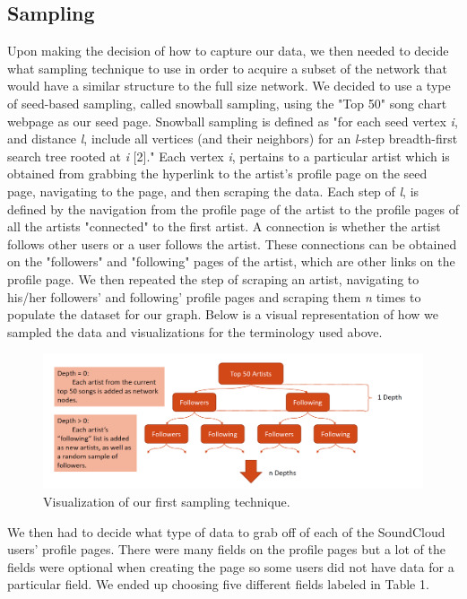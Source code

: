 \documentclass{article}
\begin{document}
\subsection{Sampling}

Upon making the decision of how to capture our data, we then needed to decide what sampling technique to use in order to acquire a subset of the network that would have a similar structure to the full size network.  We decided to use a type of seed-based sampling, called snowball sampling, using the "Top 50" song chart webpage as our seed page.  Snowball sampling is defined as "for each seed vertex \textit{i}, and distance \textit{l}, include all vertices (and their neighbors) for an \textit{l}-step breadth-first search tree rooted at \textit{i} [2]."  Each vertex \textit{i}, pertains to a particular artist which is obtained from grabbing the hyperlink to the artist's profile page on the seed page, navigating to the page, and then scraping the data.  Each step of \textit{l}, is defined by the navigation from the profile page of the artist to the profile pages of all the artists "connected" to the first artist.  A connection is whether the artist follows other users or a user follows the artist.  These connections can be obtained on the "followers" and "following" pages of the artist, which are other links on the profile page.  We then repeated the step of scraping an artist, navigating to his/her followers' and following' profile pages and scraping them \textit{n} times to populate the dataset for our graph.  Below is a visual representation of how we sampled the data and visualizations for the terminology used above.

\begin{figure}[h]
	\centering
	\includegraphics[scale=0.45]{sampling_visualization}
	\caption{Visualization of our first sampling technique.}
\end{figure}

We then had to decide what type of data to grab off of each of the SoundCloud users' profile pages.  There were many fields on the profile pages but a lot of the fields were optional when creating the page so some users did not have data for a particular field.  We ended up choosing five different fields labeled in Table 1.
\end{document}
